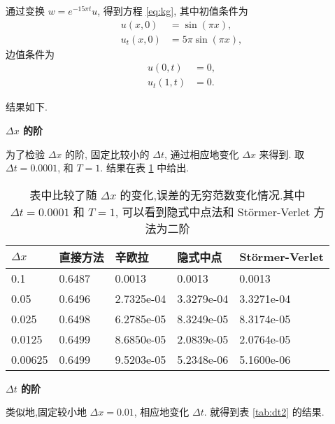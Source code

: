 通过变换 $w=e^{-15\pi t}u$, 得到方程 \eqref{eq:kg}, 其中初值条件为
\begin{equation*}
\begin{aligned}
u(x,0)&=\sin(\pi x),\\
u_t(x,0)&=5\pi \sin(\pi x),
\end{aligned}
\end{equation*}
边值条件为
\begin{equation*}
\begin{aligned}
u(0,t)&=0,\\
u_t(1,t)&=0.
\end{aligned}
\end{equation*}

结果如下.

\textbf{$\Delta x$ 的阶}

为了检验 $\Delta x$ 的阶, 固定比较小的 $\Delta
t$, 通过相应地变化 $\Delta x$ 来得到. 取 $\Delta t = 0.0001$, 和 $T
= 1$. 结果在表 \ref{tab:dx2} 中给出.

\begin{table}[h]
  \centering
\caption{表中比较了随 $\Delta x$ 的变化,误差的无穷范数变化情况.其中 $\Delta t=0.0001$ 和 $T=1$, 可以看到隐式中点法和 St\"{o}rmer-Verlet 方法为二阶}
\begin{tabularx}{\linewidth}{XXXXX}
 \toprule[1.5pt]
$\Delta x$ &直接方法 & 辛欧拉 & 隐式中点 & St\"{o}rmer-Verlet\\
 \midrule[1pt]
 0.1 & 0.6487 & 0.0013 & 0.0013 & 0.0013\\
 0.05 & 0.6496 & 2.7325e-04 & 3.3279e-04 & 3.3271e-04\\
 0.025 & 0.6498 & 6.2785e-05 & 8.3249e-05 & 8.3174e-05\\
 0.0125 & 0.6499 & 8.6850e-05 & 2.0839e-05 & 2.0764e-05\\
 0.00625 & 0.6499 & 9.5203e-05 & 5.2348e-06 & 5.1600e-06\\
 \bottomrule[1.5pt]
\end{tabularx}
  \label{tab:dx2}
\end{table}

\textbf{$\Delta t$ 的阶}

类似地,固定较小地 $\Delta x = 0.01$, 相应地变化 $\Delta t$. 就得到表 \ref{tab:dt2} 的结果.


